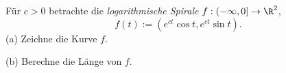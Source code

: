 \begin{prob}
F\"ur $c>0$ betrachte die {\em logarithmische Spirale}
$f:(-\infty,0]\to\R^2$,  
$$
   f(t) := (e^{ct}\cos t,e^{ct}\sin t).
$$
(a) Zeichne die Kurve $f$.

(b) Berechne die L\"ange von $f$.
\end{prob}

